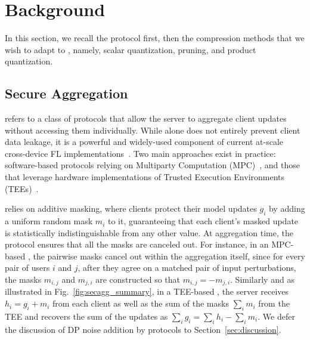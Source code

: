 \newcommand{\parai}[1]{\noindent\textit{#1}}

\section{Background}
\label{sec:background}

In this section, we recall the \SecAgg protocol first, then the compression methods that we wish to adapt to \SecAgg, namely, scalar quantization, pruning, and product quantization.

\subsection{Secure Aggregation}
\label{subsec:secagg}

\SecAgg refers to a class of protocols that allow the server to aggregate client updates without accessing them individually. While \SecAgg alone does not entirely prevent client data leakage, it is a powerful and widely-used component of current at-scale cross-device FL implementations~\citep{kairouz2019advances}. Two main approaches exist in practice: software-based protocols relying on Multiparty Computation (MPC)~\citep{bonavitz2019federated,bell2020secure,LightSecAgg}, and those that leverage hardware implementations of Trusted Execution Environments (TEEs)~\citep{huba2021papaya}. 


\SecAgg relies on additive masking, where clients protect their model updates $g_i$ by adding a uniform random mask $m_i$ to it, guaranteeing that each client’s masked update is statistically indistinguishable from any other value. 
At aggregation time, the protocol ensures that all the masks are canceled out. For instance, in an MPC-based \SecAgg, the pairwise masks cancel out within the aggregation itself, since for every pair of users $i$ and $j$, after they agree on a matched pair of input perturbations, the masks $m_{i,j}$ and $m_{j,i}$ are constructed so that $m_{i,j}=-m_{j,i}$.
Similarly and as illustrated in Fig.~\ref{fig:secagg_summary}, in a TEE-based \SecAgg, the server receives $h_i = g_i + m_i$ from each client as well as the sum of the masks $\sum_i m_i$ from the TEE and recovers the sum of the updates as
$
      \sum_i g_i = \sum_i h_i - \sum_i m_i.
$
We defer the discussion of DP noise addition by \SecAgg protocols to Section~\ref{sec:discussion}.

